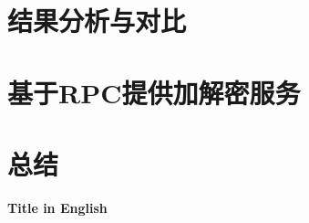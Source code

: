 \documentclass[a4paper,zihao=5,UTF8]{ctexart}
\begin{document}
\section{结果分析与对比}

\section{基于RPC提供加解密服务}

\section{总结}

\begin{thebibliography}{10}






\end{thebibliography}

\begin{center}
    \Large{
        \textbf{
            Title in English
        }
    }

    
\end{center}

\noindent{}
\songti{

}

\noindent{}
\songti{
    
}
\end{document}
